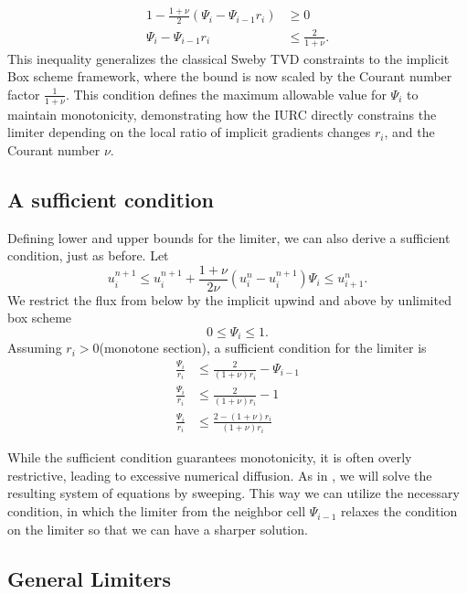 \begin{equation}
    \begin{split}
        1 - \frac{1+\nu}{2} \left( \Psi_i - \Psi_{i-1}r_i \right) &\geq 0\\
        \Psi_i - \Psi_{i-1}r_i &\leq \frac{2}{1+\nu}.
    \end{split}
\end{equation}
This inequality generalizes the classical Sweby TVD constraints \cite{sweby1984high} to the implicit Box scheme framework, where the bound is now scaled by the Courant number factor \(\frac{1}{1+\nu}\).
This condition defines the maximum allowable value for \(\Psi_i\) to maintain monotonicity, demonstrating how the IURC directly constrains the limiter depending on the local ratio of implicit gradients changes \(r_i\), and the Courant number \(\nu\).

\subsection{A sufficient condition}%
\label{sub:implicit_limiter_suff}

Defining lower and upper bounds for the limiter, we can also derive a sufficient condition, just as before.
Let
\[
    u_{i}^{n+1} \leq u_{i}^{n+1} + \frac{1+\nu}{2\nu} \left( u_{i}^{n}-u_{i}^{n+1} \right) \Psi_i \leq u_{i+1}^{n}.
\]
We restrict the flux from below by the implicit upwind and above by unlimited box scheme
\[
    0 \leq \Psi_i \leq 1.
\]
Assuming \(r_i>0\)(monotone section), a sufficient condition for the limiter is 
\begin{equation*}
    \begin{split}
        \frac{\Psi_i}{r_i} &\leq \frac{2}{(1+\nu)r_i} - \Psi_{i-1}\\
        \frac{\Psi_i}{r_i} &\leq \frac{2}{(1+\nu)r_i} - 1\\
        \frac{\Psi_i}{r_i} &\leq \frac{2 - (1+\nu)r_i}{(1+\nu)r_i}
    \end{split}
\end{equation*}

While the sufficient condition guarantees monotonicity, it is often overly restrictive, leading to excessive numerical diffusion.
As in \cite{frolkovic2023high}, we will solve the resulting system of equations by sweeping.
This way we can utilize the necessary condition, in which the limiter from the neighbor cell \(\Psi_{i-1}\) relaxes the condition on the limiter so that we can have a sharper solution.

\subsection{General Limiters}%
\label{sub:implicit_limiter_general}


